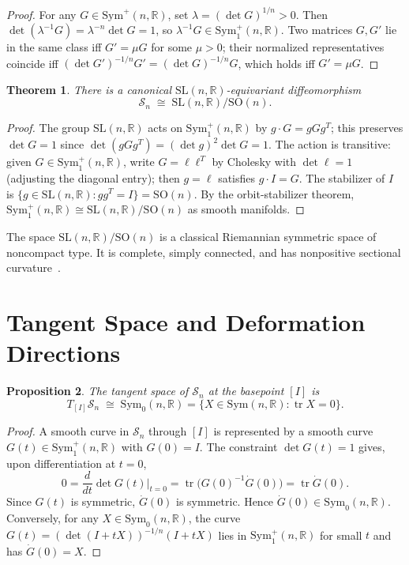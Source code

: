 \documentclass[12pt]{article}
\newtheorem{theorem}{Theorem}[section]
\newtheorem{proposition}[theorem]{Proposition}
\theoremstyle{definition}
\theoremstyle{remark}
\newcommand{\R}{\mathbb{R}}
\newcommand{\SL}{\mathrm{SL}}
\newcommand{\SO}{\mathrm{SO}}
\newcommand{\Sym}{\mathrm{Sym}}
\newcommand{\Symp}{\mathrm{Sym}^{+}}
\newcommand{\Symz}{\mathrm{Sym}_{0}}
\newcommand{\calM}{\mathcal{S}}
\newcommand{\tr}{\operatorname{tr}}
\begin{document}
\begin{proof}
For any $G \in \Symp(n,\R)$, set $\lambda = (\det G)^{1/n} > 0$.
Then $\det(\lambda^{-1} G) = \lambda^{-n} \det G = 1$, so
$\lambda^{-1} G \in \Symp_1(n,\R)$.
Two matrices $G, G'$ lie in the same class iff $G' = \mu G$ for some
$\mu > 0$; their normalized representatives coincide iff
$(\det G')^{-1/n} G' = (\det G)^{-1/n} G$, which holds iff $G' = \mu G$.
\end{proof}

\begin{theorem}
\label{thm:symspace}
There is a canonical $\SL(n,\R)$-equivariant diffeomorphism
\[
  \calM_n \;\cong\; \SL(n,\R)/\SO(n).
\]
\end{theorem}

\begin{proof}
The group $\SL(n,\R)$ acts on $\Symp_1(n,\R)$ by $g \cdot G = gGg^T$;
this preserves $\det G = 1$ since $\det(gGg^T) = (\det g)^2 \det G = 1$.
The action is transitive: given $G \in \Symp_1(n,\R)$, write
$G = \ell \ell^T$ by Cholesky with $\det\ell = 1$ (adjusting the
diagonal entry); then $g = \ell$ satisfies $g \cdot I = G$.
The stabilizer of $I$ is $\{g \in \SL(n,\R) : gg^T = I\} = \SO(n)$.
By the orbit-stabilizer theorem, $\Symp_1(n,\R) \cong \SL(n,\R)/\SO(n)$
as smooth manifolds.
\end{proof}

The space $\SL(n,\R)/\SO(n)$ is a classical Riemannian symmetric space
of noncompact type.
It is complete, simply connected, and has nonpositive sectional
curvature~\cite{Helgason}.

\section{Tangent Space and Deformation Directions}
\label{sec:tangent}

\begin{proposition}
\label{prop:tangent}
The tangent space of $\calM_n$ at the basepoint $[I]$ is
\[
  T_{[I]}\calM_n \;\cong\; \Symz(n,\R)
  = \{X \in \Sym(n,\R) : \tr X = 0\}.
\]
\end{proposition}

\begin{proof}
A smooth curve in $\calM_n$ through $[I]$ is represented by a smooth
curve $G(t) \in \Symp_1(n,\R)$ with $G(0) = I$.
The constraint $\det G(t) = 1$ gives, upon differentiation at $t=0$,
\[
  0 = \frac{d}{dt}\det G(t)\big|_{t=0}
    = \tr\!\bigl(G(0)^{-1}\dot{G}(0)\bigr)
    = \tr \dot{G}(0).
\]
Since $G(t)$ is symmetric, $\dot{G}(0)$ is symmetric.
Hence $\dot{G}(0) \in \Symz(n,\R)$.
Conversely, for any $X \in \Symz(n,\R)$, the curve
$G(t) = (\det(I + tX))^{-1/n}(I + tX)$ lies in $\Symp_1(n,\R)$
for small $t$ and has $\dot{G}(0) = X$.
\end{proof}
\end{document}
